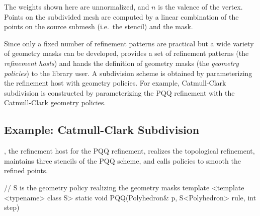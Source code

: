 
The weights shown here are unnormalized, and $n$ is the valence 
of the vertex. 
Points on the subdivided mesh are computed by a linear combination
of the points on the source submesh (i.e.~the stencil) and the mask.

Since only a fixed number of refinement patterns are 
practical but a wide variety of geometry masks can be developed,
 provides a set of refinement patterns 
(the \emph{refinement hosts})
and hands the definition of geometry masks
(the \emph{geometry policies}) to the library user.
A subdivision scheme is obtained by parameterizing the 
refinement host with geometry policies. 
For example, Catmull-Clark subdivision is constructed by 
parameterizing the PQQ refinement with the Catmull-Clark geometry 
policies.



\subsection{Example: Catmull-Clark Subdivision}
, the refinement 
host for the PQQ refinement, realizes the topological 
refinement, maintains three stencils of the 
PQQ scheme, and calls policies to smooth the refined points.

\begin{ccExampleCode}
  // S is the geometry policy realizing the geometry masks
  template <template <typename> class S>
  static void PQQ(Polyhedron& p, S<Polyhedron> rule, int step)
\end{ccExampleCode}

